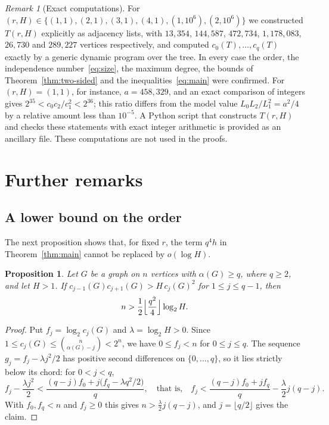 \documentclass[11pt]{amsart}
\newtheorem{proposition}[theorem]{Proposition}
\theoremstyle{definition}
\theoremstyle{remark}
\newtheorem{remark}[theorem]{Remark}
\numberwithin{equation}{section}
\begin{document}
\begin{remark}[Exact computations]\label{rem:computation}
For $(r,H)\in\{(1,1),(2,1),(3,1),(4,1),(1,10^6),(2,10^6)\}$ we constructed $T(r,H)$ explicitly as adjacency lists, with $13{,}354$, $144{,}587$, $472{,}734$, $1{,}178{,}083$, $26{,}730$ and $289{,}227$ vertices respectively, and computed $c_0(T),\dots,c_q(T)$ exactly by a generic dynamic program over the tree. In every case the order, the independence number~\eqref{eq:size}, the maximum degree, the bounds of Theorem~\ref{thm:two-sided} and the inequalities~\eqref{eq:main} were confirmed. For $(r,H)=(1,1)$, for instance, $a=458{,}329$, and an exact comparison of integers gives $2^{35}<c_0c_2/c_1^2<2^{36}$; this ratio differs from the model value $L_0L_2/L_1^2=a^2/4$ by a relative amount less than $10^{-5}$. A Python script that constructs $T(r,H)$ and checks these statements with exact integer arithmetic is provided as an ancillary file. These computations are not used in the proofs.
\end{remark}

\section{Further remarks}\label{sec:remarks}

\subsection{A lower bound on the order}
The next proposition shows that, for fixed $r$, the term $q^4h$ in Theorem~\ref{thm:main} cannot be replaced by $o(\log H)$.

\begin{proposition}\label{prop:lower-order}
Let $G$ be a graph on $n$ vertices with $\alpha(G)\ge q$, where $q\ge2$, and let $H>1$. If $c_{j-1}(G)c_{j+1}(G)>H\,c_j(G)^2$ for $1\le j\le q-1$, then
\[
n>\frac12\Bigl\lfloor\frac{q^2}4\Bigr\rfloor\log_2H.
\]
\end{proposition}

\begin{proof}
Put $f_j=\log_2c_j(G)$ and $\lambda=\log_2H>0$. Since $1\le c_j(G)\le\binom n{\alpha(G)-j}<2^n$, we have $0\le f_j<n$ for $0\le j\le q$. The sequence $g_j=f_j-\lambda j^2/2$ has positive second differences on $\{0,\dots,q\}$, so it lies strictly below its chord: for $0<j<q$,
\[
f_j-\frac{\lambda j^2}2<\frac{(q-j)f_0+j\bigl(f_q-\lambda q^2/2\bigr)}q,\quad\text{that is,}\quad f_j<\frac{(q-j)f_0+jf_q}q-\frac\lambda2j(q-j).
\]
With $f_0,f_q<n$ and $f_j\ge0$ this gives $n>\frac\lambda2j(q-j)$, and $j=\lfloor q/2\rfloor$ gives the claim.
\end{proof}
\end{document}
